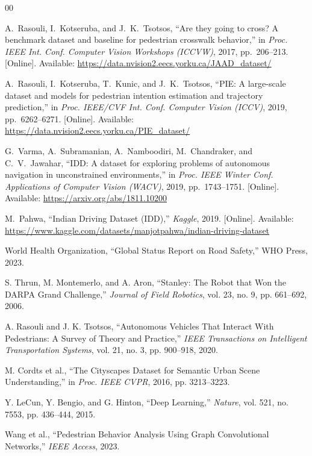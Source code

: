 \documentclass[conference]{IEEEtran}
\begin{document}
\begin{thebibliography}{00}

A.~Rasouli, I.~Kotseruba, and J.~K.~Tsotsos, ``Are they going to cross? A benchmark dataset and baseline for pedestrian crosswalk behavior,'' in \emph{Proc. IEEE Int. Conf. Computer Vision Workshops (ICCVW)}, 2017, pp.~206--213. [Online]. Available: \url{https://data.nvision2.eecs.yorku.ca/JAAD_dataset/}

A.~Rasouli, I.~Kotseruba, T.~Kunic, and J.~K.~Tsotsos, ``PIE: A large-scale dataset and models for pedestrian intention estimation and trajectory prediction,'' in \emph{Proc. IEEE/CVF Int. Conf. Computer Vision (ICCV)}, 2019, pp.~6262--6271. [Online]. Available: \url{https://data.nvision2.eecs.yorku.ca/PIE_dataset/}

G.~Varma, A.~Subramanian, A.~Namboodiri, M.~Chandraker, and C.~V.~Jawahar, ``IDD: A dataset for exploring problems of autonomous navigation in unconstrained environments,'' in \emph{Proc. IEEE Winter Conf. Applications of Computer Vision (WACV)}, 2019, pp.~1743--1751. [Online]. Available: \url{https://arxiv.org/abs/1811.10200}

M.~Pahwa, ``Indian Driving Dataset (IDD),'' \emph{Kaggle}, 2019. [Online]. Available: \url{https://www.kaggle.com/datasets/manjotpahwa/indian-driving-dataset}

World Health Organization, ``Global Status Report on Road Safety,'' WHO Press, 2023.

S. Thrun, M. Montemerlo, and A. Aron, ``Stanley: The Robot that Won the DARPA Grand Challenge,'' \textit{Journal of Field Robotics}, vol. 23, no. 9, pp. 661--692, 2006.

A. Rasouli and J. K. Tsotsos, ``Autonomous Vehicles That Interact With Pedestrians: A Survey of Theory and Practice,'' \textit{IEEE Transactions on Intelligent Transportation Systems}, vol. 21, no. 3, pp. 900--918, 2020.

M. Cordts et al., ``The Cityscapes Dataset for Semantic Urban Scene Understanding,'' in \textit{Proc. IEEE CVPR}, 2016, pp. 3213--3223.

Y. LeCun, Y. Bengio, and G. Hinton, ``Deep Learning,'' \textit{Nature}, vol. 521, no. 7553, pp. 436--444, 2015.

Wang et al., ``Pedestrian Behavior Analysis Using Graph Convolutional Networks,'' \textit{IEEE Access}, 2023.


\end{thebibliography}
\end{document}
